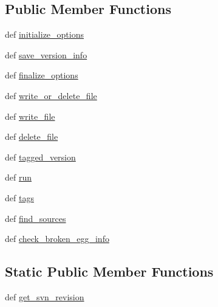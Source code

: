 \subsection*{Public Member Functions}
\begin{DoxyCompactItemize}
\item 
def \hyperlink{classsetuptools_1_1command_1_1egg__info_1_1egg__info_a594673b1a0069819a0a190005d9e914f}{initialize\+\_\+options}
\item 
def \hyperlink{classsetuptools_1_1command_1_1egg__info_1_1egg__info_acdd50e1096fb73b156a98493eb944302}{save\+\_\+version\+\_\+info}
\item 
def \hyperlink{classsetuptools_1_1command_1_1egg__info_1_1egg__info_a5e8277188c543aa0a6b5e9e6a86200d1}{finalize\+\_\+options}
\item 
def \hyperlink{classsetuptools_1_1command_1_1egg__info_1_1egg__info_a4cbb513faf3e30d782b774ec40ac0a80}{write\+\_\+or\+\_\+delete\+\_\+file}
\item 
def \hyperlink{classsetuptools_1_1command_1_1egg__info_1_1egg__info_af7a6f52295b95fccf51eeaca57ecd6e5}{write\+\_\+file}
\item 
def \hyperlink{classsetuptools_1_1command_1_1egg__info_1_1egg__info_a1b0ac3e7e3359e935df44e0a644674de}{delete\+\_\+file}
\item 
def \hyperlink{classsetuptools_1_1command_1_1egg__info_1_1egg__info_a927eb3832b5bc8f4a2cfa26e045a3373}{tagged\+\_\+version}
\item 
def \hyperlink{classsetuptools_1_1command_1_1egg__info_1_1egg__info_a650b95e313616c807d0ebfc2590b93f9}{run}
\item 
def \hyperlink{classsetuptools_1_1command_1_1egg__info_1_1egg__info_a59ca9b9577dcaec72b69e190b9c69555}{tags}
\item 
def \hyperlink{classsetuptools_1_1command_1_1egg__info_1_1egg__info_ae4eb73e19af8d19ca64aff5b48e6a35c}{find\+\_\+sources}
\item 
def \hyperlink{classsetuptools_1_1command_1_1egg__info_1_1egg__info_a610925c104de52e7790775f1de3961bd}{check\+\_\+broken\+\_\+egg\+\_\+info}
\end{DoxyCompactItemize}
\subsection*{Static Public Member Functions}
\begin{DoxyCompactItemize}
\item 
def \hyperlink{classsetuptools_1_1command_1_1egg__info_1_1egg__info_a299d574ff18dedb5eb20e263e7cd112c}{get\+\_\+svn\+\_\+revision}
\end{DoxyCompactItemize}
